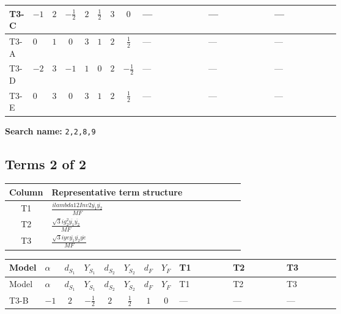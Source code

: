 \documentclass[8pt]{article}
\begin{document}
\begin{landscape}
\begin{longtable}{@{}llcccccc >{\raggedright\arraybackslash}p{0.21\linewidth} >{\raggedright\arraybackslash}p{0.21\linewidth} >{\raggedright\arraybackslash}p{0.21\linewidth}@{}}
\midrule
T3-C & $-1$ & $2$ & $-\frac{1}{2}$ & $2$ & $\frac{1}{2}$ & $3$ & $0$ & --- & --- & --- \\
\midrule
T3-A & $0$ & $1$ & $0$ & $3$ & $1$ & $2$ & $\frac{1}{2}$ & --- & --- & --- \\
\midrule
T3-D & $-2$ & $3$ & $-1$ & $1$ & $0$ & $2$ & $-\frac{1}{2}$ & --- & --- & --- \\
\midrule
T3-E & $0$ & $3$ & $0$ & $3$ & $1$ & $2$ & $\frac{1}{2}$ & --- & --- & --- \\
\midrule
\bottomrule
\end{longtable}
\clearpage
\noindent\textbf{Search name: }\texttt{2,2,8,9}\par\smallskip
\subsection*{Terms 2 of 2}
\begin{center}
\begin{tabular}{@{}c >{\raggedright\arraybackslash}p{0.82\linewidth}@{}}
\toprule
Column & Representative term structure \\
\midrule
T1 & \(\displaystyle \frac{i lambda12Inv2 \overline{y_{1}} \overline{y_{2}}}{MF}\) \\
\midrule
T2 & \(\displaystyle \frac{\sqrt{3} i g_{2}^{2} \overline{y_{1}} \overline{y_{2}}}{MF}\) \\
\midrule
T3 & \(\displaystyle \frac{\sqrt{3} i ye \overline{y_{1}} \overline{y_{2}} \overline{ye}}{MF}\) \\
\midrule
\bottomrule
\end{tabular}
\end{center}
\smallskip
\tiny
\begin{longtable}{@{}llcccccc >{\raggedright\arraybackslash}p{0.21\linewidth} >{\raggedright\arraybackslash}p{0.21\linewidth} >{\raggedright\arraybackslash}p{0.21\linewidth}@{}}
\toprule
Model & $\alpha$ & $d_{S_1}$ & $Y_{S_1}$ & $d_{S_2}$ & $Y_{S_2}$ & $d_F$ & $Y_F$ & T1 & T2 & T3 \\
\midrule
\endfirsthead
\toprule
Model & $\alpha$ & $d_{S_1}$ & $Y_{S_1}$ & $d_{S_2}$ & $Y_{S_2}$ & $d_F$ & $Y_F$ & T1 & T2 & T3 \\
\midrule
\endhead
T3-B & $-1$ & $2$ & $-\frac{1}{2}$ & $2$ & $\frac{1}{2}$ & $1$ & $0$ & --- & --- & --- \\
\midrule

\end{longtable}
\end{landscape}
\end{document}
